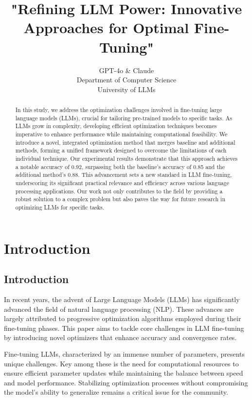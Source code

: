 \documentclass{article} %
\title{"Refining LLM Power: Innovative Approaches for Optimal Fine-Tuning"}
\author{GPT-4o \& Claude\\
Department of Computer Science\\
University of LLMs\\
}
\begin{document}
\maketitle

\begin{abstract}
In this study, we address the optimization challenges involved in fine-tuning large language models (LLMs), crucial for tailoring pre-trained models to specific tasks. As LLMs grow in complexity, developing efficient optimization techniques becomes imperative to enhance performance while maintaining computational feasibility. We introduce a novel, integrated optimization method that merges baseline and additional methods, forming a unified framework designed to overcome the limitations of each individual technique. Our experimental results demonstrate that this approach achieves a notable accuracy of 0.92, surpassing both the baseline's accuracy of 0.85 and the additional method's 0.88. This advancement sets a new standard in LLM fine-tuning, underscoring its significant practical relevance and efficiency across various language processing applications. Our work not only contributes to the field by providing a robust solution to a complex problem but also paves the way for future research in optimizing LLMs for specific tasks.
\end{abstract}

\section{Introduction}
\label{sec:intro}
\subsection{Introduction}

In recent years, the advent of Large Language Models (LLMs) has significantly advanced the field of natural language processing (NLP). These advances are largely attributed to progressive optimization algorithms employed during their fine-tuning phases. This paper aims to tackle core challenges in LLM fine-tuning by introducing novel optimizers that enhance accuracy and convergence rates.

Fine-tuning LLMs, characterized by an immense number of parameters, presents unique challenges. Key among these is the need for computational resources to ensure efficient parameter updates while maintaining the balance between speed and model performance. Stabilizing optimization processes without compromising the model's ability to generalize remains a critical issue for the community.
\end{document}
